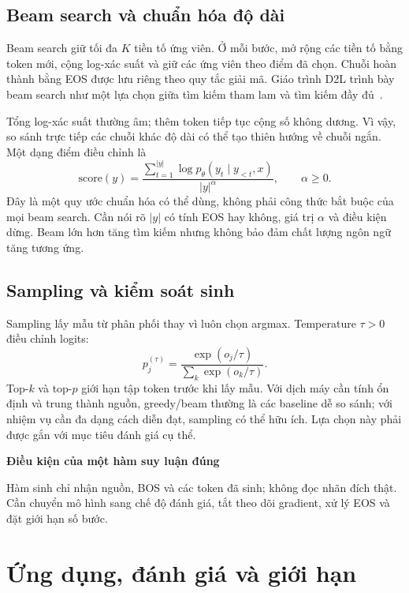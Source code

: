 \documentclass[11pt,a4paper]{article}
\numberwithin{equation}{section}
\newcommand{\notebox}[2]{\par\smallskip\noindent
  \begingroup\setlength{\fboxsep}{10pt}\colorbox{PaleBlue}{%
  \parbox{\dimexpr\linewidth-20pt\relax}{\textbf{\color{ReportBlue}#1}\par\smallskip #2}}%
  \endgroup\par\smallskip}
\begin{document}
\subsection{Beam search và chuẩn hóa độ dài}
Beam search giữ tối đa $K$ tiền tố ứng viên. Ở mỗi bước, mở rộng các tiền tố bằng token mới, cộng log-xác suất và giữ các ứng viên theo điểm đã chọn. Chuỗi hoàn thành bằng EOS được lưu riêng theo quy tắc giải mã. Giáo trình D2L trình bày beam search như một lựa chọn giữa tìm kiếm tham lam và tìm kiếm đầy đủ~\cite{d2lbeam}.

Tổng log-xác suất thường âm; thêm token tiếp tục cộng số không dương. Vì vậy, so sánh trực tiếp các chuỗi khác độ dài có thể tạo thiên hướng về chuỗi ngắn. Một dạng điểm điều chỉnh là
\begin{equation}
\mathrm{score}(y)=\frac{\sum_{t=1}^{|y|}\log p_\theta(y_t\mid y_{<t},x)}{|y|^\alpha},
\qquad \alpha\geq0.
\end{equation}
Đây là một quy ước chuẩn hóa có thể dùng, không phải công thức bắt buộc của mọi beam search. Cần nói rõ $|y|$ có tính EOS hay không, giá trị $\alpha$ và điều kiện dừng. Beam lớn hơn tăng tìm kiếm nhưng không bảo đảm chất lượng ngôn ngữ tăng tương ứng.

\subsection{Sampling và kiểm soát sinh}
Sampling lấy mẫu từ phân phối thay vì luôn chọn argmax. Temperature $\tau>0$ điều chỉnh logits:
\begin{equation}
p_j^{(\tau)}=\frac{\exp(o_j/\tau)}{\sum_k\exp(o_k/\tau)}.
\end{equation}
Top-$k$ và top-$p$ giới hạn tập token trước khi lấy mẫu. Với dịch máy cần tính ổn định và trung thành nguồn, greedy/beam thường là các baseline dễ so sánh; với nhiệm vụ cần đa dạng cách diễn đạt, sampling có thể hữu ích. Lựa chọn này phải được gắn với mục tiêu đánh giá cụ thể.

\notebox{Điều kiện của một hàm suy luận đúng}{Hàm sinh chỉ nhận nguồn, BOS và các token đã sinh; không đọc nhãn đích thật. Cần chuyển mô hình sang chế độ đánh giá, tắt theo dõi gradient, xử lý EOS và đặt giới hạn số bước.}

\section{Ứng dụng, đánh giá và giới hạn}
\end{document}
